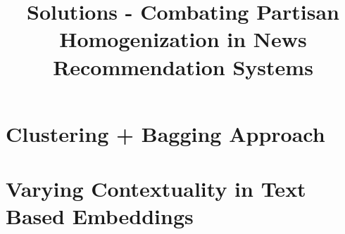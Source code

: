 \documentclass[a4paper,fontsize=9.0pt]{scrartcl}
\title{\textbf{Solutions - Combating Partisan Homogenization in News Recommendation Systems}}
\date{\vspace{-10ex}}
\begin{document}
\maketitle

\tableofcontents
\newpage
\section{Clustering + Bagging Approach}
\section{Varying Contextuality in Text Based Embeddings}
\end{document}
